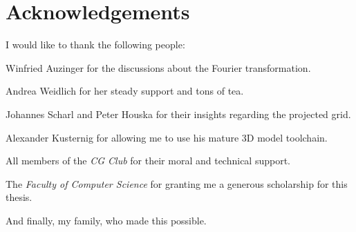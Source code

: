 \chapter{Acknowledgements}

\setlength{\parindent}{0mm}

\bigskip

I would like to thank the following people:\bigskip

Winfried Auzinger for the discussions about the Fourier transformation.\bigskip

Andrea Weidlich for her steady support and tons of tea.\bigskip

Johannes Scharl and Peter Houska for their insights regarding the projected
grid.\bigskip

Alexander Kusternig for allowing me to use his mature 3D model
toolchain.\bigskip

All members of the \textit{CG Club} for their moral and technical
support.\bigskip

The \textit{Faculty of Computer Science} for granting me a generous scholarship
for this thesis.\bigskip

And finally, my family, who made this possible.\bigskip






